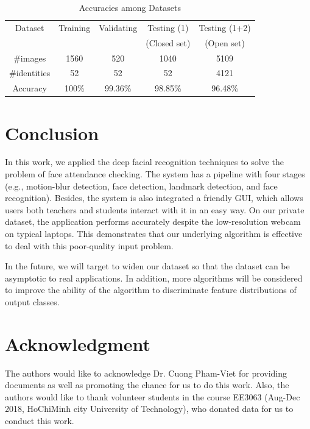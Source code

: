 \documentclass[journal, twocolumn]{IEEEtran}
\begin{document}
\begin{table}
\centering
	\caption{Accuracies among Datasets}
	\label{table:accuracy}
		\begin{tabularx}{0.935\linewidth}{ccccc}
		\toprule
		Dataset  &  Training  &  Validating   &  Testing (1)   &  Testing (1+2)  \\
		~        &  ~         &  ~            &  (Closed set)  &  (Open set)  \\
		\midrule
		\#images      &  1560   &  520      &  1040     &  5109  \\
		\#identities  &  52     &  52       &  52       &  4121  \\
		Accuracy      &  100\%  &  99.36\%  &  98.85\%  &  96.48\%  \\
		\bottomrule
	\end{tabularx}
\end{table}


\medskip
\section{Conclusion}
\label{conclusion}

In this work, we applied the deep facial recognition techniques to solve the problem of face attendance checking. The system has a pipeline with four stages (e.g., motion-blur detection, face detection, landmark detection, and face recognition). Besides, the system is also integrated a friendly GUI, which allows users both teachers and students interact with it in an easy way. On our private dataset, the application performs accurately despite the low-resolution webcam on typical laptops. This demonstrates that our underlying algorithm is effective to deal with this poor-quality input problem.

In the future, we will target to widen our dataset so that the dataset can be asymptotic to real applications. In addition, more algorithms will be considered to improve the ability of the algorithm to discriminate feature distributions of output classes.


\section*{Acknowledgment}

The authors would like to acknowledge Dr. Cuong Pham-Viet for providing documents as well as promoting the chance for us to do this work. Also, the authors would like to thank volunteer students in the course EE3063 (Aug-Dec 2018, HoChiMinh city University of Technology), who donated data for us to conduct this work.


\begin{thebibliography}{9}

\end{thebibliography}
\end{document}
